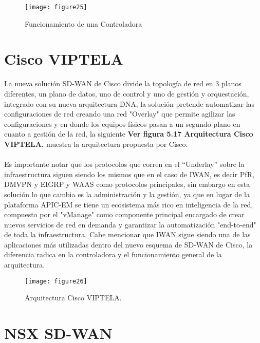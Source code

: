 \begin{figure}[htbp]
  \centering
    {\texttt{[image: figure25]}}%
  \caption{Funcionamiento de una Controladora}
  \label{fig:fig2subfig}
\end{figure}




\section{Cisco VIPTELA}
\label{sec:Cisco VIPTELA}
La nueva solución SD-WAN de Cisco divide la topología de red en 3 planos diferentes, un plano de datos, uno de control y uno de gestión y orquestación, integrado con su nueva arquitectura DNA, la solución pretende automatizar las configuraciones de red creando una red "Overlay" que permite agilizar las configuraciones y en donde los equipos físicos pasan a un segundo plano en cuanto a gestión de la red, la siguiente
\textbf{Ver figura 5.17 Arquitectura Cisco VIPTELA.}  muestra la arquitectura propuesta por Cisco. 
\\
\\
Es importante notar que los protocolos que corren en el “Underlay” sobre la infraestructura siguen siendo
los mismos que en el caso de IWAN, es decir PfR, DMVPN y EIGRP y WAAS como protocolos principales, sin embargo en esta solución lo que cambia es la administración y la gestión, ya que en lugar de la plataforma APIC-EM se tiene un ecosistema más rico en inteligencia de la red, compuesto por el "vManage" como componente principal
encargado de crear nuevos servicios de red en demanda y garantizar la automatización "end-to-end" de toda la infraestructura. Cabe mencionar que IWAN sigue siendo una de las aplicaciones más utilizadas dentro del nuevo esquema de SD-WAN de Cisco, la diferencia radica en la controladora y el funcionamiento general de la arquitectura.

\begin{figure}[htbp]
  \centering
    {\texttt{[image: figure26]}}%
  \caption{Arquitectura Cisco VIPTELA.}
  \label{fig:fig2subfig}
\end{figure}

\section{NSX SD-WAN}
\label{sec:NSX SD-WAN}


